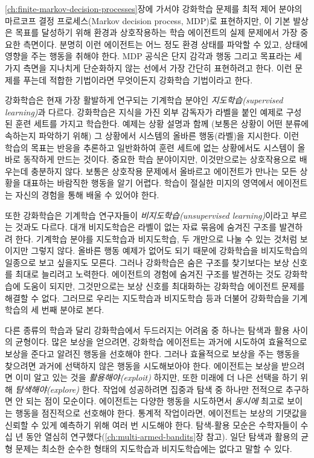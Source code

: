 \ref{ch:finite-markov-decision-processes}장에 가서야 강화학습 문제를 최적 제어
분야의 마르코프 결정 프로세스(Markov decision process, MDP)로 표현하지만, 이
기본 발상은 목표를 달성하기 위해 환경과 상호작용하는 학습 에이전트의 실제
문제에서 가장 중요한 측면이다. 분명히 이런 에이전트는 어느 정도 환경 상태를
파악할 수 있고, 상태에 영향을 주는 행동을 취해야 한다. MDP 공식은 단지 감각과
행동 그리고 목표라는 세 가지 측면을 지나치게 단순화하지 않는 선에서 가장 간단히
표현하려고 한다. 이런 문제를 푸는데 적합한 기법이라면 무엇이든지 강화학습
기법이라고 한다.

강화학습은 현재 가장 활발하게 연구되는 기계학습 분야인
\emph{지도학습(supervised learning)}과 다르다. 강화학습은 지식을 가진 외부
감독자가 라벨을 붙인 예제로 구성된 훈련 세트를 가지고 학습한다. 예제는 상황
설명과 함께 (보통은 상황이 어떤 분류에 속하는지 파악하기 위해) 그 상황에서
시스템의 올바른 행동(라벨)을 지시한다. 이런 학습의 목표는 반응을 추론하고
일반화하여 훈련 세트에 없는 상황에서도 시스템이 올바로 동작하게 만드는 것이다.
중요한 학습 분야이지만, 이것만으로는 상호작용으로 배우는데 충분하지 않다. 보통은
상호작용 문제에서 올바르고 에이전트가 만나는 모든 상황을 대표하는 바람직한
행동을 알기 어렵다. 학습이 절실한 미지의 영역에서 에이전트는 자신의 경험을 통해
배울 수 있어야 한다.

또한 강화학습은 기계학습 연구자들이 \emph{비지도학습(unsupervised
learning)}이라고 부르는 것과도 다르다. 대개
비지도학습은 라벨이 없는 자료 묶음에 숨겨진 구조를 발견하려 한다. 기계학습
분야를 지도학습과 비지도학습, 두 개만으로 나눌 수 있는 것처럼 보이지만 그렇지
않다. 올바른 행동 예제가 없어도 되기 때문에 강화학습을 비지도학습의 일종으로
보고 싶을지도 모른다. 그러나 강화학습은 숨은 구조를 찾기보다는 보상 신호를
최대로 늘리려고 노력한다. 에이전트의 경험에 숨겨진 구조를 발견하는 것도
강화학습에 도움이 되지만, 그것만으로는 보상 신호를 최대화하는 강화학습 에이전트
문제를 해결할 수 없다. 그러므로 우리는 지도학습과 비지도학습 등과 더불어
강화학습을 기계학습의 세 번째 분야로 본다.


다른 종류의 학습과 달리 강화학습에서 두드러지는 어려움 중 하나는 탐색과 활용
사이의 균형이다. 많은 보상을 얻으려면, 강화학습 에이전트는 과거에 시도하여
효율적으로 보상을 준다고 알려진 행동을 선호해야 한다. 그러나 효율적으로 보상을
주는 행동을 찾으려면 과거에 선택하지 않은 행동을 시도해보아야 한다. 에이전트는
보상을 받으려면 이미 알고 있는 것을 \emph{활용해야(exploit)} 하지만, 또한 미래에
더 나은 선택을 하기 위해 \emph{탐색해야(explore)} 한다. 작업에 성공하려면 집중과
탐색 중 하나만 전적으로 추구하면 안 되는 점이 모순이다. 에이전트는 다양한 행동을
시도하면서 \emph{동시에} 최고로 보이는 행동을 점진적으로 선호해야 한다. 통계적
작업이라면, 에이전트는 보상의 기댓값을 신뢰할 수 있게 예측하기 위해 여러 번
시도해야 한다. 탐색-활용 모순은 수학자들이 수십 년 동안 열심히
연구했다(\ref{ch:multi-armed-bandits}장 참고). 일단 탐색과 활용의 균형 문제는
최소한 순수한 형태의 지도학습과 비지도학습에는 없다고 말할 수 있다.

